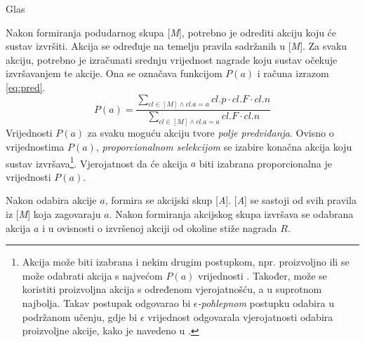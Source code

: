 \documentclass[times, utf8, zavrsni]{fer}
\begin{document}
\begin{algorithm}
    \caption{Glas}
    \label{vote}
    \begin{algorithmic}
        \ENDIF
    \end{algorithmic}
\end{algorithm}

Nakon formiranja podudarnog skupa [\emph{M}], potrebno je odrediti akciju koju će sustav izvršiti.
Akcija se određuje na temelju pravila sadržanih u [\emph{M}].
Za svaku akciju, potrebno je izračunati srednju vrijednost nagrade koju sustav očekuje izvršavanjem te akcije.
Ona se označava funkcijom $P(a)$ i računa izrazom \eqref{eq:pred}.
\begin{equation}
    \label{eq:pred}
    P(a) = \frac{\sum_{cl \in [M] \land cl.a = a} cl.p \cdot cl.F \cdot cl.n}{\sum_{cl \in [M] \land cl.a = a} cl.F \cdot cl.n}
\end{equation}
Vrijednosti $P(a)$ za svaku moguću akciju tvore \emph{polje predviđanja}.
Ovisno o vrijednostima $P(a)$, \emph{proporcionalnom selekcijom} se izabire konačna akcija koju sustav izvršava\footnote{Akcija može biti izabrana i nekim drugim postupkom, npr. proizvoljno  ili se može odabrati akcija s najvećom $P(a)$ vrijednosti .
Također, može se koristiti proizvoljna akcija s određenom vjerojatnošću, a u suprotnom najbolja.
Takav postupak odgovarao bi \emph{$\epsilon$-pohlepnom}  postupku odabira u podržanom učenju, gdje bi $\epsilon$ vrijednost odgovarala vjerojatnosti odabira proizvoljne akcije, kako je navedeno u \citep{1}.}.
Vjerojatnost da će akcija $a$ biti izabrana proporcionalna je vrijednosti $P(a)$.

Nakon odabira akcije $a$, formira se akcijski skup [\emph{A}].
[\emph{A}] se sastoji od svih pravila iz [\emph{M}] koja zagovaraju $a$.
Nakon formiranja akcijskog skupa izvršava se odabrana akcija $a$ i u ovisnosti o izvršenoj akciji od okoline stiže nagrada $R$.
\end{document}
